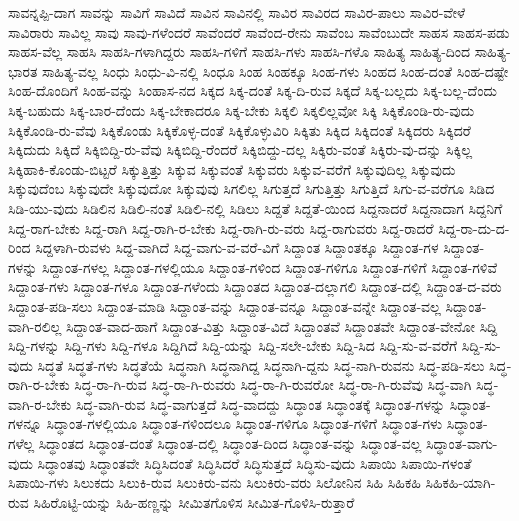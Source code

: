 {ಸಾವನ್ನಪ್ಪಿ-ದಾಗ
ಸಾವನ್ನು
ಸಾವಿಗೆ
ಸಾವಿದೆ
ಸಾವಿನ
ಸಾವಿನಲ್ಲಿ
ಸಾವಿರ
ಸಾವಿರದ
ಸಾವಿರ-ಪಾಲು
ಸಾವಿರ-ವೇಳೆ
ಸಾವಿರಾರು
ಸಾವಿಲ್ಲ
ಸಾವು
ಸಾವು-ಗಳೆಂದರೆ
ಸಾವೆಂದರೆ
ಸಾವೆಂದ-ರೇನು
ಸಾವೆಂಬ
ಸಾವೆಂಬುದೇ
ಸಾಹಸ
ಸಾಹಸ-ಪಡು
ಸಾಹಸ-ವೆಲ್ಲ
ಸಾಹಸಿ
ಸಾಹಸಿ-ಗಳಾಗಿದ್ದರು
ಸಾಹಸಿ-ಗಳಿಗೆ
ಸಾಹಸಿ-ಗಳು
ಸಾಹಸಿ-ಗಳೊ
ಸಾಹಿತ್ಯ
ಸಾಹಿತ್ಯ-ದಿಂದ
ಸಾಹಿತ್ಯ-ಭಾರತ
ಸಾಹಿತ್ಯ-ವಲ್ಲ
ಸಿಂಧು
ಸಿಂಧು-ವಿ-ನಲ್ಲಿ
ಸಿಂಧೂ
ಸಿಂಹ
ಸಿಂಹಕ್ಕೂ
ಸಿಂಹ-ಗಳು
ಸಿಂಹದ
ಸಿಂಹ-ದಂತೆ
ಸಿಂಹ-ದಷ್ಟೇ
ಸಿಂಹ-ದೊಂದಿಗೆ
ಸಿಂಹ-ವನ್ನು
ಸಿಂಹಾಸ-ನದ
ಸಿಕ್ಕದ
ಸಿಕ್ಕ-ದಂತೆ
ಸಿಕ್ಕ-ದಿ-ರುವ
ಸಿಕ್ಕದೆ
ಸಿಕ್ಕ-ಬಲ್ಲದು
ಸಿಕ್ಕ-ಬಲ್ಲ-ದೆಂದು
ಸಿಕ್ಕ-ಬಹುದು
ಸಿಕ್ಕ-ಬಾರ-ದೆಂದು
ಸಿಕ್ಕ-ಬೇಕಾದರೂ
ಸಿಕ್ಕ-ಬೇಕು
ಸಿಕ್ಕಲಿ
ಸಿಕ್ಕಲಿಲ್ಲವೋ
ಸಿಕ್ಕಿ
ಸಿಕ್ಕಿಕೊಂಡಿ-ರು-ವುದು
ಸಿಕ್ಕಿಕೊಂಡಿ-ರು-ವೆವು
ಸಿಕ್ಕಿಕೊಂಡು
ಸಿಕ್ಕಿಕೊಳ್ಳ-ದಂತೆ
ಸಿಕ್ಕಿಕೊಳ್ಳುವಿರಿ
ಸಿಕ್ಕಿತು
ಸಿಕ್ಕಿದ
ಸಿಕ್ಕಿದಂತೆ
ಸಿಕ್ಕಿದರು
ಸಿಕ್ಕಿದರೆ
ಸಿಕ್ಕಿದುದು
ಸಿಕ್ಕಿದೆ
ಸಿಕ್ಕಿಬಿದ್ದಿ-ರು-ವೆವು
ಸಿಕ್ಕಿಬಿದ್ದಿ-ರೆಂದರೆ
ಸಿಕ್ಕಿಬಿದ್ದು-ದಲ್ಲ
ಸಿಕ್ಕಿರು-ವಂತೆ
ಸಿಕ್ಕಿರು-ವು-ದನ್ನು
ಸಿಕ್ಕಿಲ್ಲ
ಸಿಕ್ಕಿಹಾಕಿ-ಕೊಂಡು-ಬಿಟ್ಟರೆ
ಸಿಕ್ಕುತ್ತಿತ್ತು
ಸಿಕ್ಕುವ
ಸಿಕ್ಕುವಂತೆ
ಸಿಕ್ಕುವರು
ಸಿಕ್ಕುವ-ವರೆಗೆ
ಸಿಕ್ಕುವುದಿಲ್ಲ
ಸಿಕ್ಕುವುದು
ಸಿಕ್ಕುವುದೆಂಬ
ಸಿಕ್ಕುವುದೇ
ಸಿಕ್ಕುವುದೋ
ಸಿಕ್ಕುವುವು
ಸಿಗಲಿಲ್ಲ
ಸಿಗುತ್ತದೆ
ಸಿಗುತ್ತಿತ್ತು
ಸಿಗುತ್ತಿದೆ
ಸಿಗು-ವ-ವರೆಗೂ
ಸಿಡಿದ
ಸಿಡಿ-ಯು-ವುದು
ಸಿಡಿಲಿನ
ಸಿಡಿಲಿ-ನಂತೆ
ಸಿಡಿಲಿ-ನಲ್ಲಿ
ಸಿಡಿಲು
ಸಿದ್ದತೆ
ಸಿದ್ದತೆ-ಯಿಂದ
ಸಿದ್ದನಾದರೆ
ಸಿದ್ದನಾದಾಗ
ಸಿದ್ದನಿಗೆ
ಸಿದ್ದ-ರಾಗ-ಬೇಕು
ಸಿದ್ದ-ರಾಗಿ
ಸಿದ್ದ-ರಾಗಿ-ರ-ಬೇಕು
ಸಿದ್ದ-ರಾಗಿ-ರು-ವರು
ಸಿದ್ದ-ರಾಗುವರು
ಸಿದ್ದ-ರಾದರೆ
ಸಿದ್ದ-ರಾ-ದು-ದ-ರಿಂದ
ಸಿದ್ದಳಾಗಿ-ರುವಳು
ಸಿದ್ದ-ವಾಗಿದೆ
ಸಿದ್ದ-ವಾಗು-ವ-ವರೆ-ವಿಗೆ
ಸಿದ್ದಾಂತ
ಸಿದ್ದಾಂತಕ್ಕೂ
ಸಿದ್ದಾಂತ-ಗಳ
ಸಿದ್ದಾಂತ-ಗಳನ್ನು
ಸಿದ್ದಾಂತ-ಗಳಲ್ಲ
ಸಿದ್ದಾಂತ-ಗಳಲ್ಲಿಯೂ
ಸಿದ್ದಾಂತ-ಗಳಿಂದ
ಸಿದ್ದಾಂತ-ಗಳಿಗೂ
ಸಿದ್ದಾಂತ-ಗಳಿಗೆ
ಸಿದ್ದಾಂತ-ಗಳಿವೆ
ಸಿದ್ದಾಂತ-ಗಳು
ಸಿದ್ದಾಂತ-ಗಳೂ
ಸಿದ್ದಾಂತ-ಗಳೆಂದು
ಸಿದ್ದಾಂತದ
ಸಿದ್ದಾಂತ-ದಲ್ಲಾಗಲಿ
ಸಿದ್ದಾಂತ-ದಲ್ಲಿ
ಸಿದ್ದಾಂತ-ದ-ವರು
ಸಿದ್ದಾಂತ-ಪಡಿ-ಸಲು
ಸಿದ್ದಾಂತ-ಮಾಡಿ
ಸಿದ್ದಾಂತ-ವನ್ನು
ಸಿದ್ದಾಂತ-ವನ್ನೂ
ಸಿದ್ದಾಂತ-ವನ್ನೇ
ಸಿದ್ದಾಂತ-ವಲ್ಲ
ಸಿದ್ದಾಂತ-ವಾಗಿ-ರಲಿಲ್ಲ
ಸಿದ್ದಾಂತ-ವಾದ-ಹಾಗೆ
ಸಿದ್ದಾಂತ-ವಿತ್ತು
ಸಿದ್ದಾಂತ-ವಿದೆ
ಸಿದ್ದಾಂತವೆ
ಸಿದ್ದಾಂತವೇ
ಸಿದ್ದಾಂತ-ವೇನೋ
ಸಿದ್ದಿ
ಸಿದ್ದಿ-ಗಳನ್ನು
ಸಿದ್ದಿ-ಗಳು
ಸಿದ್ದಿ-ಗಳೂ
ಸಿದ್ದಿಗಿದೆ
ಸಿದ್ದಿ-ಯನ್ನು
ಸಿದ್ದಿ-ಸಲೇ-ಬೇಕು
ಸಿದ್ದಿ-ಸಿದ
ಸಿದ್ದಿ-ಸು-ವ-ವರೆಗೆ
ಸಿದ್ದಿ-ಸು-ವುದು
ಸಿದ್ಧತೆ
ಸಿದ್ಧತೆ-ಗಳು
ಸಿದ್ಧತೆಯೆ
ಸಿದ್ಧನಾಗಿ
ಸಿದ್ಧನಾಗಿದ್ದ
ಸಿದ್ಧನಾಗಿ-ದ್ದನು
ಸಿದ್ಧ-ನಾಗಿ-ರುವನು
ಸಿದ್ಧ-ಪಡಿ-ಸಲು
ಸಿದ್ಧ-ರಾಗಿ-ರ-ಬೇಕು
ಸಿದ್ಧ-ರಾ-ಗಿ-ರುವ
ಸಿದ್ಧ-ರಾ-ಗಿ-ರುವರು
ಸಿದ್ಧ-ರಾ-ಗಿ-ರುವರೋ
ಸಿದ್ಧ-ರಾ-ಗಿ-ರುವೆವು
ಸಿದ್ಧ-ವಾಗಿ
ಸಿದ್ಧ-ವಾಗಿ-ರ-ಬೇಕು
ಸಿದ್ಧ-ವಾಗಿ-ರುವ
ಸಿದ್ಧ-ವಾಗುತ್ತದೆ
ಸಿದ್ಧ-ವಾದದ್ದು
ಸಿದ್ಧಾಂತ
ಸಿದ್ಧಾಂತಕ್ಕೆ
ಸಿದ್ಧಾಂತ-ಗಳನ್ನು
ಸಿದ್ಧಾಂತ-ಗಳನ್ನೂ
ಸಿದ್ಧಾಂತ-ಗಳಲ್ಲಿಯೂ
ಸಿದ್ಧಾಂತ-ಗಳಿಂದಲೂ
ಸಿದ್ಧಾಂತ-ಗಳಿಗೂ
ಸಿದ್ಧಾಂತ-ಗಳಿಗೆ
ಸಿದ್ಧಾಂತ-ಗಳು
ಸಿದ್ಧಾಂತ-ಗಳೆಲ್ಲ
ಸಿದ್ಧಾಂತದ
ಸಿದ್ಧಾಂತ-ದಂತೆ
ಸಿದ್ಧಾಂತ-ದಲ್ಲಿ
ಸಿದ್ಧಾಂತ-ದಿಂದ
ಸಿದ್ಧಾಂತ-ವನ್ನು
ಸಿದ್ಧಾಂತ-ವಲ್ಲ
ಸಿದ್ಧಾಂತ-ವಾಗು-ವುದು
ಸಿದ್ಧಾಂತವು
ಸಿದ್ಧಾಂತವೇ
ಸಿದ್ಧಿಸಿದಂತೆ
ಸಿದ್ಧಿಸಿದರೆ
ಸಿದ್ಧಿಸುತ್ತದೆ
ಸಿದ್ಧಿಸು-ವುದು
ಸಿಪಾಯಿ
ಸಿಪಾಯಿ-ಗಳಂತೆ
ಸಿಪಾಯಿ-ಗಳು
ಸಿಲುಕದು
ಸಿಲುಕಿ-ರುವ
ಸಿಲುಕಿರು-ವನು
ಸಿಲುಕಿರು-ವರು
ಸಿಲೋನಿನ
ಸಿಹಿ
ಸಿಹಿಕಹಿ
ಸಿಹಿಕಹಿ-ಯಾಗಿ-ರುವ
ಸಿಹಿರೊಟ್ಟಿ-ಯನ್ನು
ಸಿಹಿ-ಹಣ್ಣನ್ನು
ಸೀಮಿತಗೊಳಿಸ
ಸೀಮಿತ-ಗೊಳಿಸಿ-ರುತ್ತಾರೆ
}
